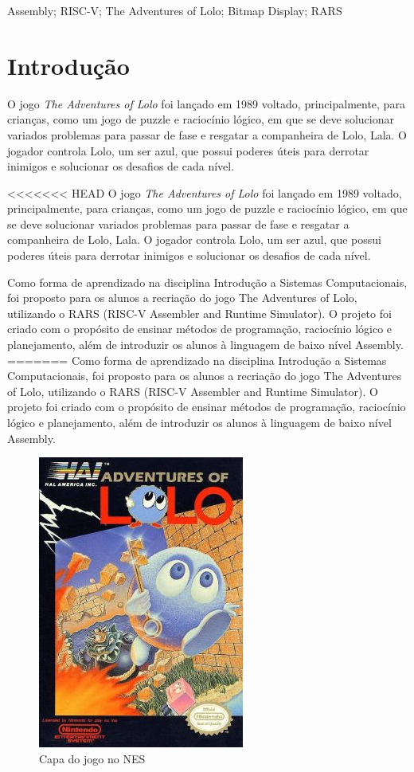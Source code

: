 \documentclass[10pt, conference, compsocconf]{IEEEtran}
\begin{document}
\begin{IEEEkeywords}
Assembly; RISC-V; The Adventures of Lolo; Bitmap Display; RARS
\end{IEEEkeywords}


\section{Introdução}
O jogo \textit{The Adventures of Lolo} foi lançado em 1989 voltado, principalmente, para crianças, como um jogo de puzzle e raciocínio lógico, em que se deve solucionar variados problemas para passar de fase e resgatar a companheira de Lolo, Lala. O jogador controla Lolo, um ser azul, que possui poderes úteis para derrotar inimigos e solucionar os desafios de cada nível.

<<<<<<< HEAD
O jogo \textit{The Adventures of Lolo} foi lançado em 1989 voltado, principalmente, para crianças, como um jogo de puzzle e raciocínio lógico, em que se deve solucionar variados problemas para passar de fase e resgatar a companheira de Lolo, Lala. O jogador controla Lolo, um ser azul, que possui poderes úteis para derrotar inimigos e solucionar os desafios de cada nível.

Como forma de aprendizado na disciplina Introdução a Sistemas Computacionais, foi proposto para os alunos a recriação do jogo The Adventures of Lolo, utilizando o RARS (RISC-V Assembler and Runtime Simulator). O projeto foi criado com o propósito de ensinar métodos de programação, raciocínio lógico e planejamento, além de introduzir os alunos à linguagem de baixo nível Assembly.
=======
Como forma de aprendizado na disciplina Introdução a Sistemas Computacionais, foi proposto para os alunos a recriação do jogo The Adventures of Lolo, utilizando o RARS (RISC-V Assembler and Runtime Simulator). O projeto foi criado com o propósito de ensinar métodos de programação, raciocínio lógico e planejamento, além de introduzir os alunos à linguagem de baixo nível Assembly.

\begin{figure}[htb]
  \begin{center}
   \includegraphics[width=0.3\linewidth]{./Figures/image_1.png}
  \end{center}
  \caption{Capa do jogo no NES}
  \label{fig:01}
\end{figure}
\end{document}
